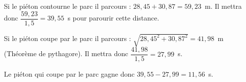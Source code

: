 %
%
    Si le piéton contourne le parc il parcours : $28,45 + 30,87 = 59,23$~m. Il mettra donc $\dfrac{59,23}{1,5}=39,55$~s pour parourir cette distance.

    Si le piéton coupe par le parc il parcours : $\sqrt{28,45^2 + 30,87^2}=41,98$~m (Théorème de pythagore). Il mettra donc $\dfrac{41,98}{1,5} = 27,99$~s.

    Le piéton qui coupe par le parc gagne donc $39,55 - 27,99 = 11,56$~s.
